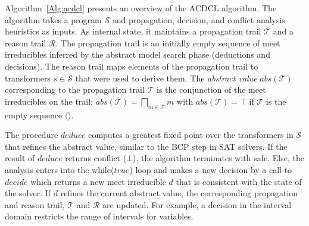 Algorithm~\ref{Alg:acdcl} presents an overview of the ACDCL algorithm.
The algorithm takes a program 
$\mathcal{S}$ and propagation, decision, and conflict analysis
heuristics as inputs.  
As internal state, it maintains a propagation
trail $\mathcal{T}$ and a reason trail  $\mathcal{R}$.
The propagation trail is an initially empty sequence of meet
irreducibles inferred by the abstract model search phase (deductions
and decisions). The reason trail maps  elements of the
propagation trail to transformers $s\in\mathcal{S}$ that were used to
derive them. The \emph{abstract value} $\mathit{abs}(\mathcal{T})$
corresponding to the propagation trail $\mathcal{T}$ is the
conjunction of the meet irreducibles on the trail:
$\mathit{abs}(\mathcal{T})=\bigsqcap_{m \in \mathcal{T}}m$ with
$\mathit{abs}(\mathcal{T})=\top$ if $\mathcal{T}$ is the empty
sequence $\langle\rangle$.

The procedure $deduce$ computes a greatest fixed point over the
transformers in $\mathcal{S}$ that refines the abstract value,
similar to the BCP step in SAT solvers.  If the result of $deduce$
returns \textsf{conflict} ($\bot$), the algorithm terminates with
\textsf{safe}.  Else, the analysis enters into the while($true$) loop
and makes a new decision by a call to $\mathit{decide}$ which returns
a new meet irreducible $d$ that is consistent with the state of the
solver.  If $d$
refines the current abstract value, the corresponding propagation
and reason trail, $\mathcal{T}$ and $\mathcal{R}$ are updated.
%
For example, a decision in the interval domain restricts the range of 
intervals for variables.

